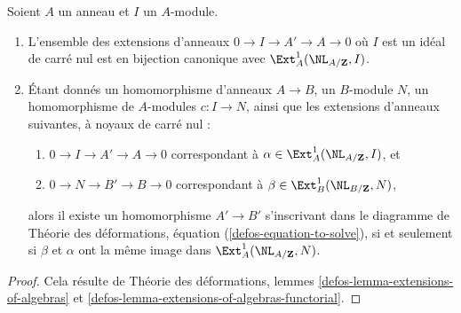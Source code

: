 \begin{lemma}
\label{lemma-extensions-of-rings}
Soient $A$ un anneau et $I$ un $A$-module.
\begin{enumerate}
\item L'ensemble des extensions d'anneaux $0 \to I \to A' \to A \to 0$
où $I$ est un idéal de carré nul est en bijection canonique avec
$\Ext^1_A(\NL_{A/\mathbf{Z}}, I)$.
\item Étant donnés un homomorphisme d'anneaux $A \to B$, un $B$-module $N$,
un homomorphisme de $A$-modules $c : I \to N$, ainsi que les extensions
d'anneaux suivantes, à noyaux de carré nul :
\begin{enumerate}
\item[(a)] $0 \to I \to A' \to A \to 0$ correspondant à
$\alpha \in \Ext^1_A(\NL_{A/\mathbf{Z}}, I)$, et
\item[(b)] $0 \to N \to B' \to B \to 0$ correspondant à
$\beta \in \Ext^1_B(\NL_{B/\mathbf{Z}}, N)$,
\end{enumerate}
alors il existe un homomorphisme $A' \to B'$ s'inscrivant dans
le diagramme de Théorie des déformations, équation (\ref{defos-equation-to-solve}),
si et seulement si $\beta$ et $\alpha$
ont la même image dans
$\Ext^1_A(\NL_{A/\mathbf{Z}}, N)$.
\end{enumerate}
\end{lemma}

\begin{proof}
Cela résulte de Théorie des déformations, lemmes
\ref{defos-lemma-extensions-of-algebras} et
\ref{defos-lemma-extensions-of-algebras-functorial}.
\end{proof}

